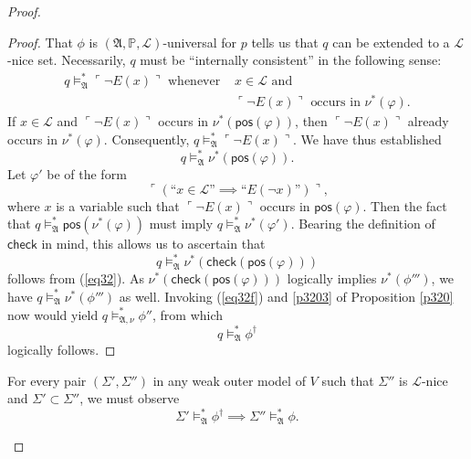 \documentclass[12pt]{article}
\numberwithin{equation}{section}
\begin{document}
\begin{proof}
\begin{enumerate}[label=Case \arabic*:, leftmargin=50pt]
\begin{proof}
    That $\phi$ is $(\mathfrak{A}, \mathbb{P}, \mathcal{L})$-universal for $p$ tells us that $q$ can be extended to a $\mathcal{L}$-nice set. Necessarily, $q$ must be ``internally consistent'' in the following sense:
    \begin{align*}
        q \models^{*}_{\mathfrak{A}} \ulcorner \neg E(x) \urcorner \text{ whenever } & x \in \mathcal{L} \text{ and } \\
        & \ulcorner \neg E(x) \urcorner \text{ occurs in } \nu^*(\varphi).
    \end{align*} 
    If $x \in \mathcal{L}$ and $\ulcorner \neg E(x) \urcorner$ occurs in $\nu^*(\mathsf{pos}(\varphi))$, then $\ulcorner \neg E(x) \urcorner$ already occurs in $\nu^*(\varphi)$. Consequently, $q \models^{*}_{\mathfrak{A}} \ulcorner \neg E(x) \urcorner$. We have thus established 
    \begin{equation}\label{eq32}
        q \models^{*}_{\mathfrak{A}} \nu^*(\mathsf{pos}(\varphi)).
    \end{equation} 
    Let $\varphi'$ be of the form $$\ulcorner (\text{``}x \in \mathcal{L} \text{''} \implies \text{``} E(\neg x) \text{''}) \urcorner \text{,}$$ where $x$ is a variable such that $\ulcorner \neg E(x) \urcorner$ occurs in $\mathsf{pos}(\varphi)$. Then the fact that $q \models^{*}_{\mathfrak{A}} \mathsf{pos}(\nu^*(\varphi))$ must imply $q \models^{*}_{\mathfrak{A}} \nu^*(\varphi')$. Bearing the definition of $\mathsf{check}$ in mind, this allows us to ascertain that $$q \models^{*}_{\mathfrak{A}} \nu^*(\mathsf{check}(\mathsf{pos}(\varphi)))$$ follows from (\ref{eq32}). As $\nu^*(\mathsf{check}(\mathsf{pos}(\varphi)))$ logically implies $\nu^*(\phi''')$, we have $q \models^{*}_{\mathfrak{A}} \nu^*(\phi''')$ as well. Invoking (\ref{eq32f}) and \ref{p3203} of Proposition \ref{p320} now would yield $q \models^{*}_{\mathfrak{A}, \nu} \phi''$, from which
    \begin{equation*}
        q \models^{*}_{\mathfrak{A}} \phi^{\dagger}
    \end{equation*}
    logically follows.
    \end{proof}

    \begin{claim2}\label{claim341}
    For every pair $(\Sigma', \Sigma'')$ in any weak outer model of $V$ such that $\Sigma''$ is $\mathcal{L}$-nice and $\Sigma' \subset \Sigma''$, we must observe
    \begin{equation*}
        \Sigma' \models^{*}_{\mathfrak{A}} \phi^{\dagger} \implies \Sigma'' \models^{*}_{\mathfrak{A}} \phi \text{.}
    \end{equation*}
    \end{claim2}


\end{enumerate}
\end{proof}
\end{document}
